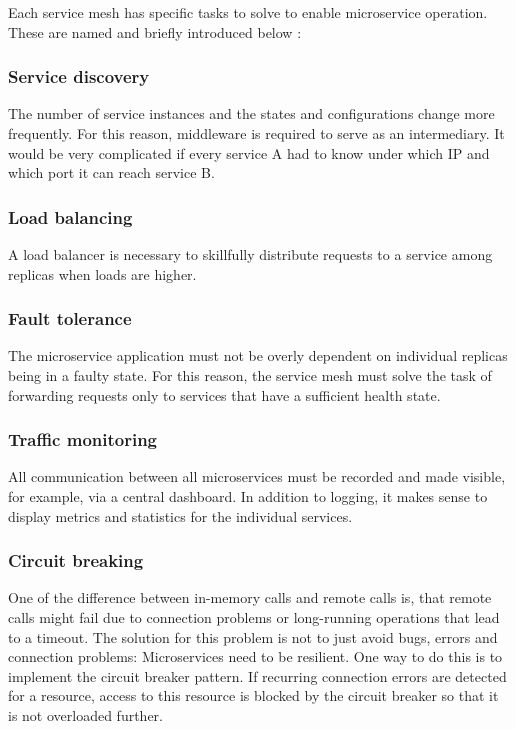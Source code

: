 Each service mesh has specific tasks to solve to enable microservice operation. These are named and briefly introduced below \cite{sm1}:

\subsubsection{Service discovery}

The number of service instances and the states and configurations change more frequently. For this reason, middleware is required to serve as an intermediary. It would be very complicated if every service A had to know under which IP and which port it can reach service B.

\subsubsection{Load balancing}

A load balancer is necessary to skillfully distribute requests to a service among replicas when loads are higher.

\subsubsection{Fault tolerance}

The microservice application must not be overly dependent on individual replicas being in a faulty state. For this reason, the service mesh must solve the task of forwarding requests only to services that have a sufficient health state.

\subsubsection{Traffic monitoring}

All communication between all microservices must be recorded and made visible, for example, via a central dashboard. In addition to logging, it makes sense to display metrics and statistics for the individual services.

\subsubsection{Circuit breaking}
One of the difference between in-memory calls and remote calls is, that remote calls might fail due to connection problems or long-running operations that lead to a timeout. The solution for this problem is not to just avoid bugs, errors and connection problems: Microservices need to be resilient. One way to do this is to implement the circuit breaker pattern. If recurring connection errors are detected for a resource, access to this resource is blocked by the circuit breaker so that it is not overloaded further.

